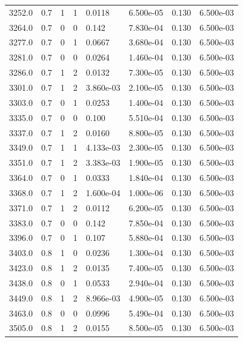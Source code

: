 \documentclass[preview]{standalone}
\begin{document}
{{{{{{{\begin{tabular}{L{1.2cm}C{1.2cm} C{0.3cm}C{0.5cm} C{1.4cm}C{1.4cm} C{1.4cm}C{1.4cm}}
  3252.0  &   0.7  & 1     &  1 &  0.0118  & 6.500e-05  & 0.130 &  6.500e-03   \\ 
  3264.0  &   0.7  & 0     &  0 &  0.142  & 7.830e-04  & 0.130 &  6.500e-03   \\ 
  3277.0  &   0.7  & 0     &  1 &  0.0667  & 3.680e-04  & 0.130 &  6.500e-03   \\ 
  3281.0  &   0.7  & 0     &  0 &  0.0264  & 1.460e-04  & 0.130 &  6.500e-03   \\ 
  3286.0  &   0.7  & 1     &  2 &  0.0132  & 7.300e-05  & 0.130 &  6.500e-03   \\ 
  3301.0  &   0.7  & 1     &  2 &  3.860e-03  & 2.100e-05  & 0.130 &  6.500e-03   \\ 
  3303.0  &   0.7  & 0     &  1 &  0.0253  & 1.400e-04  & 0.130 &  6.500e-03   \\ 
  3335.0  &   0.7  & 0     &  0 &  0.100  & 5.510e-04  & 0.130 &  6.500e-03   \\ 
  3337.0  &   0.7  & 1     &  2 &  0.0160  & 8.800e-05  & 0.130 &  6.500e-03   \\ 
  3349.0  &   0.7  & 1     &  1 &  4.133e-03  & 2.300e-05  & 0.130 &  6.500e-03   \\ 
  3351.0  &   0.7  & 1     &  2 &  3.383e-03  & 1.900e-05  & 0.130 &  6.500e-03   \\ 
  3364.0  &   0.7  & 0     &  1 &  0.0333  & 1.840e-04  & 0.130 &  6.500e-03   \\ 
  3368.0  &   0.7  & 1     &  2 &  1.600e-04  & 1.000e-06  & 0.130 &  6.500e-03   \\ 
  3371.0  &   0.7  & 1     &  2 &  0.0112  & 6.200e-05  & 0.130 &  6.500e-03   \\ 
  3383.0  &   0.7  & 0     &  0 &  0.142  & 7.850e-04  & 0.130 &  6.500e-03   \\ 
  3396.0  &   0.7  & 0     &  1 &  0.107  & 5.880e-04  & 0.130 &  6.500e-03   \\ 
  3403.0  &   0.8  & 1     &  0 &  0.0236  & 1.300e-04  & 0.130 &  6.500e-03   \\ 
  3423.0  &   0.8  & 1     &  2 &  0.0135  & 7.400e-05  & 0.130 &  6.500e-03   \\ 
  3438.0  &   0.8  & 0     &  1 &  0.0533  & 2.940e-04  & 0.130 &  6.500e-03   \\ 
  3449.0  &   0.8  & 1     &  2 &  8.966e-03  & 4.900e-05  & 0.130 &  6.500e-03   \\ 
  3463.0  &   0.8  & 0     &  0 &  0.0996  & 5.490e-04  & 0.130 &  6.500e-03   \\ 
  3505.0  &   0.8  & 1     &  2 &  0.0155  & 8.500e-05  & 0.130 &  6.500e-03   \\ 

\end{tabular}}}}}}}}
\end{document}
